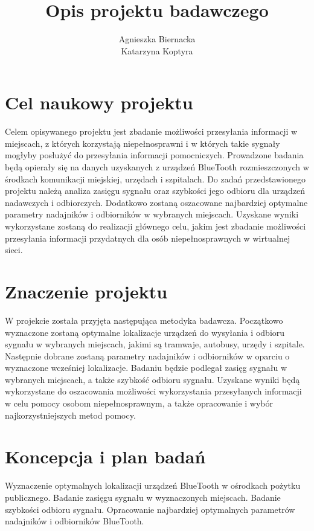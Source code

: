 \documentclass[a4paper]{article}
\begin{document}
\title{Opis projektu badawczego}
\author{Agnieszka Biernacka\\ Katarzyna Koptyra}
\maketitle

\section{Cel naukowy projektu}
Celem opisywanego projektu jest zbadanie możliwości przesyłania informacji w miejscach, z których korzystają niepełnosprawni i w których takie sygnały mogłyby posłużyć do przesyłania informacji pomocniczych. Prowadzone badania będą opierały się na danych uzyskanych z urządzeń BlueTooth rozmieszczonych w środkach komunikacji miejskiej, urzędach i szpitalach. Do zadań przedstawionego projektu należą analiza zasięgu sygnału oraz szybkości jego odbioru dla urządzeń nadawczych i odbiorczych. Dodatkowo zostaną oszacowane najbardziej optymalne parametry nadajników i odbiorników w wybranych miejscach. Uzyskane wyniki wykorzystane zostaną do realizacji głównego celu, jakim jest zbadanie możliwości przesyłania informacji przydatnych dla osób niepełnosprawnych w wirtualnej sieci.

\section{Znaczenie projektu}
W projekcie została przyjęta następująca metodyka badawcza. Początkowo wyznaczone zostaną optymalne lokalizacje urządzeń do wysyłania i odbioru sygnału w wybranych miejscach, jakimi są tramwaje, autobusy, urzędy i szpitale. Następnie dobrane zostaną parametry nadajników i odbiorników w oparciu o wyznaczone wcześniej lokalizacje. Badaniu będzie podlegał zasięg sygnału w wybranych miejscach, a także szybkość odbioru sygnału. Uzyskane wyniki będą wykorzystane do oszacowania możliwości wykorzystania przesyłanych informacji w celu pomocy osobom niepełnosprawnym, a także opracowanie i wybór najkorzystniejszych metod pomocy.

\section{Koncepcja i plan badań}
Wyznaczenie optymalnych lokalizacji urządzeń BlueTooth w ośrodkach pożytku publicznego.
Badanie zasięgu sygnału w wyznaczonych miejscach.
Badanie szybkości odbioru sygnału.
Opracowanie najbardziej optymalnych parametrów nadajników i odbiorników BlueTooth.
\end{document}
